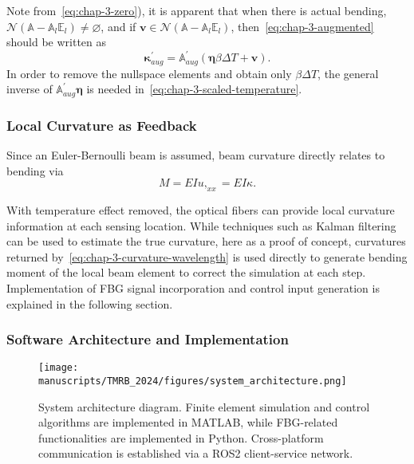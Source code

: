 Note from~\cref{eq:chap-3-zero}), it is apparent that when there is actual bending, $\mathcal{N} \left( \mathbb{A} - \mathbb{A}_l\mathbb{E}_l \right) \neq \varnothing$, and if $\mathbf{v}\in \mathcal{N} \left( \mathbb{A} - \mathbb{A}_l\mathbb{E}_l \right)$, then~\cref{eq:chap-3-augmented} should be written as
\begin{equation}
  \label{eq:chap-3-null-element}
  \boldsymbol{\kappa}^{\prime}_{aug} = \mathbb{A}^{\prime}_{aug} \left( \boldsymbol \eta\beta\Delta T + \mathbf{v} \right).
\end{equation}
In order to remove the nullspace elements and obtain only $\beta\Delta T$, the general inverse of $\mathbb{A}^{\prime}_{aug}\boldsymbol\eta$ is needed in~\cref{eq:chap-3-scaled-temperature}.

\subsubsection{Local Curvature as Feedback}
\label{sec:chap-3-local-curvature-feedback}
 Since an Euler-Bernoulli beam is assumed, beam curvature directly relates to bending via
\begin{equation}
  \label{eq:chap-3-bending-curvature}
  M=EIu,_{xx}=EI\kappa.
\end{equation}

With temperature effect removed, the optical fibers can provide local curvature information at each sensing location. While techniques such as Kalman filtering can be used to estimate the true curvature, here as a proof of concept, curvatures returned by~\cref{eq:chap-3-curvature-wavelength} is used directly to generate bending moment of the local beam element to correct the simulation at each step. Implementation of FBG signal incorporation and control input generation is explained in the following section.

\subsubsection{Software Architecture and Implementation}
\label{sec:chap-3-software-architecture-and-implementation}

\begin{figure}[t]
  \centering
  \texttt{[image: manuscripts/TMRB\_2024/figures/system\_architecture.png]}
  \caption{System architecture diagram. Finite element simulation and control algorithms are implemented in MATLAB, while FBG-related functionalities are implemented in Python. Cross-platform communication is established via a ROS2 client-service network.}
  \label{fig:chap-3-system-architecture}
\end{figure}

